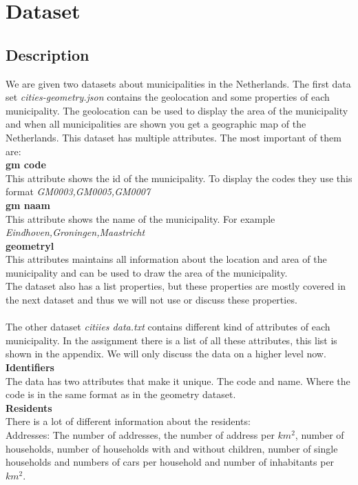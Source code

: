 \section{Dataset}\label{sec:dat}
\subsection{Description}
We are given two datasets about municipalities in the Netherlands. The first data set \emph{cities-geometry.json} contains the geolocation and some properties of each municipality. The geolocation can be used to display the area of the municipality and when all municipalities are shown you get a geographic map of the Netherlands. This dataset has multiple attributes. The most important of them are:\\
\textbf{gm code} \\
This attribute shows the id of the municipality. To display the codes they use this format \emph{GM0003,GM0005,GM0007}\\
\textbf{gm naam} \\
This attribute shows the name of the municipality. For example \emph{Eindhoven,Groningen,Maastricht} \\
\textbf{geometryl} \\
This attributes maintains all information about the location and area of the municipality and can be used to draw the area of the municipality. \\
The dataset also has a list properties, but these properties are mostly covered in the next dataset and thus we will not use or discuss these properties. \\ \\
 The other dataset \emph{ citiies data.txt}  contains different kind of attributes of each municipality. In the assignment there is a list of all these attributes, this list is shown in the appendix. We will only discuss the data on a higher level now. \\
 \textbf{Identifiers} \\
 The data has two attributes that make it unique. The code and name. Where the code  is in the same format as in the geometry dataset. \\
  \textbf{Residents} \\
There is a lot of different information about the residents:\\
Addresses: The number of addresses, the number of address per $km^{2}$, number of households, number of households with and without children, number of single households and numbers of cars per household and number of inhabitants per $km^{2}$. \\
